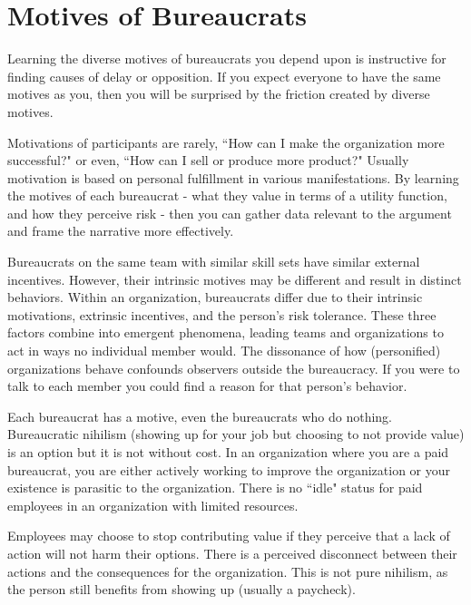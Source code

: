 \section{Motives of Bureaucrats\label{sec:motivations}}

Learning the diverse motives of bureaucrats you depend upon is instructive for finding causes of delay or opposition. If you expect everyone to have the same motives as you, then you will be surprised by the friction created by diverse motives. 

Motivations of participants are rarely, ``How can I make the organization more successful?" or even, ``How can I sell or produce more product?" Usually motivation is based on personal fulfillment in various manifestations. By learning the motives of each bureaucrat - what they value in terms of a utility function, and how they perceive risk - then you can gather data relevant to the argument and frame the narrative more effectively.


Bureaucrats on the same team with similar skill sets have similar external incentives. However, their intrinsic motives may be different and result in distinct behaviors. Within an organization, bureaucrats differ due to their intrinsic motivations,  extrinsic incentives, and the  person's risk tolerance. These three factors combine into emergent phenomena, leading teams and organizations to act in ways no individual member would. The dissonance of how (personified) organizations behave confounds observers outside the bureaucracy. If you were to talk to each member you could find a reason for that person's behavior. 



Each bureaucrat has a motive, even the bureaucrats who do nothing. Bureaucratic nihilism (showing up for your job but choosing to not provide value) is an option but it is not without cost.
In an organization where you are a paid bureaucrat, you are either actively working to improve the organization or your existence is parasitic to the organization. There is no ``idle" status for paid employees in an organization with limited resources.

Employees may choose to stop contributing value if they perceive that a lack of action will not harm their options. There is a perceived disconnect between their actions and the consequences for the organization. This is not pure nihilism, as the person still  benefits from showing up (usually a paycheck).

